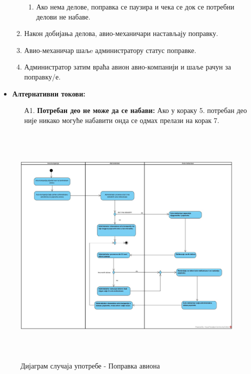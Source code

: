 \documentclass{article}
\begin{document}
\begin{itemize}
\begin{enumerate}
\begin{enumerate}
                    \item Ако нема делове, поправка се паузира и чека се док се потребни делови не набаве.
                \end{enumerate}
            \item Након добијања делова, авио-механичари настављају поправку.
            \item Авио-механичар шаљe администратору статус поправке.
            \item Администратор затим враћа авион авио-компанији и шаље рачун за поправку/е.
        \end{enumerate}
        
        \item \textbf{Алтернативни токови:}
            \begin{itemize}
                \item[А1.] \textbf{Потребан део не може да се набави:} Ако у кораку 5. потребан део није никако могуће набавити онда се одмах прелази на корак 7.
            \end{itemize}
\end{itemize}

\begin{figure}[H]
    \begin{center}
        \includegraphics[width=1.1\textwidth, height=12cm]{Dijagrami_slike/popravka_aviona.jpg}
        \caption{Дијаграм случаја употребе - Поправка авиона}
    \end{center}
\end{figure}
\end{document}

